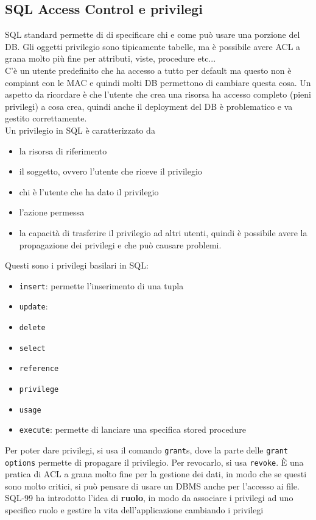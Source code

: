 \documentclass[12pt, oneside]{extbook} %
\begin{document}
\subsection{SQL Access Control e privilegi}
SQL standard permette di di specificare chi e come può usare una porzione del DB. Gli oggetti privilegio sono tipicamente tabelle, ma è possibile avere ACL a grana molto più fine per attributi, viste, procedure etc...\\C'è un utente predefinito che ha accesso a tutto per default ma questo non è compiant con le MAC e quindi molti DB permettono di cambiare questa cosa. Un aspetto da ricordare è che l'utente che crea una risorsa ha accesso completo (pieni privilegi) a cosa crea, quindi anche il deployment del DB è problematico e va gestito correttamente.\\ Un privilegio in SQL è caratterizzato da 
\begin{itemize}
	\item la risorsa di riferimento
	\item il soggetto, ovvero l'utente che riceve il privilegio
	\item chi è l'utente che ha dato il privilegio
	\item l'azione permessa
	\item la capacità di trasferire il privilegio ad altri utenti, quindi è possibile avere la propagazione dei privilegi e che può causare problemi.
\end{itemize}
Questi sono i privilegi basilari in SQL:
\begin{itemize}
	\item \texttt{insert}: permette l'inserimento di una tupla
	\item \texttt{update}: 
	\item \texttt{delete}
	\item \texttt{select}
	\item \texttt{reference}
	\item \texttt{privilege}
	\item \texttt{usage}
	\item \texttt{execute}: permette di lanciare una specifica stored procedure
\end{itemize}
Per poter dare privilegi, si usa il comando \texttt{grant}s, dove la parte delle \texttt{grant options} permette di propagare il privilegio. Per revocarlo, si usa \texttt{revoke}. È una pratica di ACL a grana molto fine per la gestione dei dati, in modo che se questi sono molto critici, si può pensare di usare un DBMS anche per l'accesso ai file. SQL-99 ha introdotto l'idea di \textbf{ruolo}, in modo da associare i privilegi ad uno specifico ruolo e gestire la vita dell'applicazione cambiando i privilegi
\end{document}
